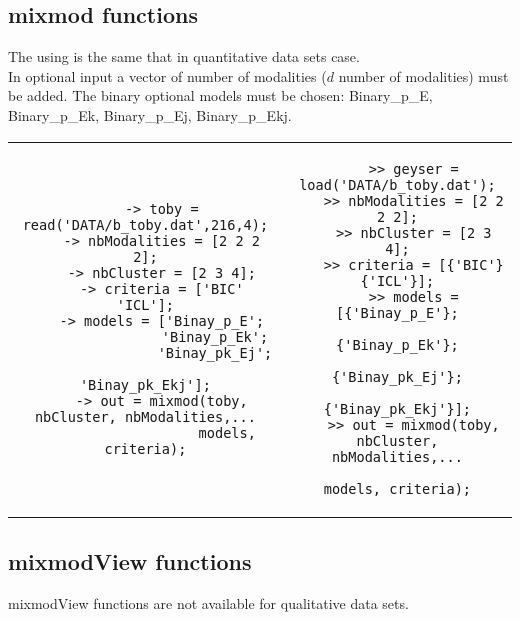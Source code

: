 \subsection{{\sc mixmod} functions}
The using is the same that in quantitative data sets case.\\ In
optional input a vector of number of modalities ($d$ number of
modalities) must be added. The binary optional models must be
chosen: Binary\_p\_E, Binary\_p\_Ek, Binary\_p\_Ej, Binary\_p\_Ekj.\\


\begin{tabular}{c|c}
\begin{minipage}[c]{0.47\columnwidth}%
{\scriptsize
\begin{verbatim}
    -> toby = read('DATA/b_toby.dat',216,4);
    -> nbModalities = [2 2 2 2];
    -> nbCluster = [2 3 4];
    -> criteria = ['BIC' 'ICL'];
    -> models = ['Binay_p_E';
                 'Binay_p_Ek';
                 'Binay_pk_Ej';
                 'Binay_pk_Ekj'];
    -> out = mixmod(toby, nbCluster, nbModalities,...
                    models, criteria);
\end{verbatim}}
\end{minipage}%
&
\begin{minipage}[c]{0.53\columnwidth}%
{\scriptsize
\begin{verbatim}
    >> geyser = load('DATA/b_toby.dat');
    >> nbModalities = [2 2 2 2];
    >> nbCluster = [2 3 4];
    >> criteria = [{'BIC'} {'ICL'}];
    >> models = [{'Binay_p_E'};
                 {'Binay_p_Ek'};
                 {'Binay_pk_Ej'};
                 {'Binay_pk_Ekj'}];
    >> out = mixmod(toby, nbCluster, nbModalities,...
                    models, criteria);
\end{verbatim}}
\end{minipage}%
\end{tabular}


\subsection{{\sc mixmodView} functions} \label{mixmodViewFunctionsSection}
mixmodView functions are not available for qualitative data sets.


